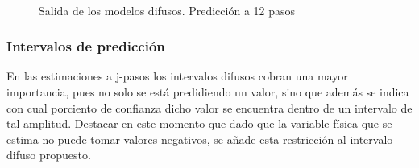 \documentclass[12pt]{article}
\begin{document}
\begin{figure}
		\centering
		\captionsetup{justification=centering}
		\\
		\caption{Salida de los modelos difusos. Predicción a 12 pasos}
		\label{f_P2Salidap12}
\end{figure}

\subsubsection{Intervalos de predicción}

En las estimaciones a j-pasos los intervalos difusos cobran una mayor importancia, pues no solo se está predidiendo un valor, sino que además se indica con cual porciento de confianza dicho valor se encuentra dentro de un intervalo de tal amplitud. Destacar en este momento que dado que la variable física que se estima no puede tomar valores negativos, se añade esta restricción al intervalo difuso propuesto.
\end{document}
